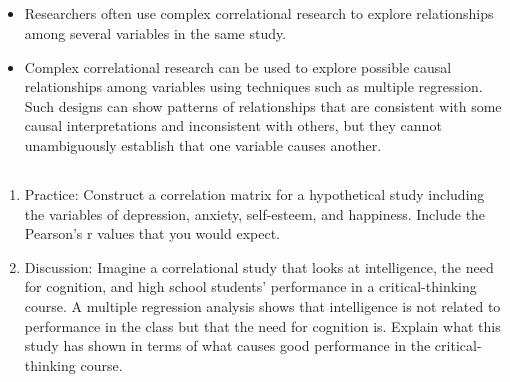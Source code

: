 \subsection{}
\begin{fullwidth}
\begin{itemize}

\item Researchers often use complex correlational research to explore relationships among several variables in the same study.
\item Complex correlational research can be used to explore possible causal relationships among variables using techniques such as multiple regression. Such designs can show patterns of relationships that are consistent with some causal interpretations and inconsistent with others, but they cannot unambiguously establish that one variable causes another.
\end{itemize}
\end{fullwidth}

\subsection{}
\begin{fullwidth}
\begin{enumerate}
\item  Practice: Construct a correlation matrix for a hypothetical study including the variables of depression, anxiety, self-esteem, and happiness. Include the Pearson's r values that you would expect.
\item Discussion: Imagine a correlational study that looks at intelligence, the need for cognition, and high school students' performance in a critical-thinking course. A multiple regression analysis shows that intelligence is not related to performance in the class but that the need for cognition is. Explain what this study has shown in terms of what causes good performance in the critical- thinking course.
\end{enumerate}
\end{fullwidth}  
